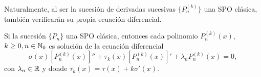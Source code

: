 Naturalmente, al ser la sucesión de derivadas sucesivas $\{P^{(k)}_n\}$ una SPO clásica, también verificarán su propia ecuación diferencial.

\begin{corolario}
    Si la sucesión $\{P_n\}$ una SPO clásica, entonces cada polinomio $P^{(k)}_n(x)$, $k\geq 0, n\in\mathbb{N}_0$ es solución de la ecuación diferencial
    \begin{equation}
        \label{eq:ec-dif-der-suc}
        \sigma(x)[P_n^{(k)}(x)]'' + \tau_k(x)[P_n^{(k)}(x)]'+\lambda_n P^{(k)}_n(x) = 0,
    \end{equation}
    con $\lambda_n\in\mathbb{R}$ y donde $\tau_k(x)=\tau(x)+k\sigma'(x)$.
\end{corolario}


